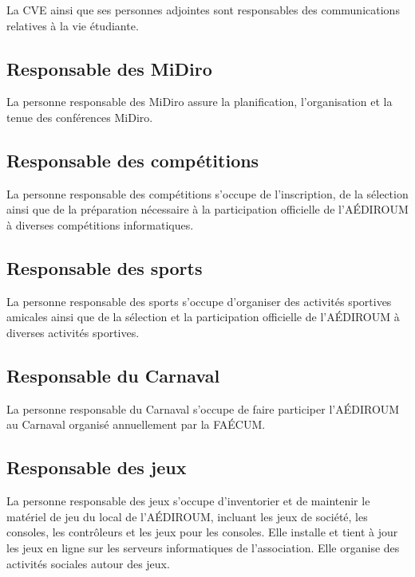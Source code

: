 \documentclass{aediroum}
\begin{document}
La CVE ainsi que ses personnes adjointes sont responsables des communications relatives à la vie étudiante.

\subsection{Responsable des MiDiro}\label{sec:responsable-midiro}

La personne responsable des MiDiro assure la planification, l'organisation et la tenue des conférences MiDiro.

\subsection{Responsable des compétitions}\label{sec:responsable-competition}

La personne responsable des compétitions s'occupe de l'inscription, de la sélection ainsi que de la préparation nécessaire à la participation officielle de l'AÉDIROUM à diverses compétitions informatiques.

\subsection{Responsable des sports}\label{sec:responsable-sport}

La personne responsable des sports s'occupe d'organiser des activités sportives amicales ainsi que de la sélection et la participation officielle de l'AÉDIROUM à diverses activités sportives.

\subsection{Responsable du Carnaval}\label{sec:responsable-carnaval}

La personne responsable du Carnaval s'occupe de faire participer l'AÉDIROUM au Carnaval organisé annuellement par la FAÉCUM.

\subsection{Responsable des jeux}\label{sec:responsable-serveur}

La personne responsable des jeux s’occupe d’inventorier et de maintenir le matériel de jeu du local de l’AÉDIROUM, incluant les jeux de société, les consoles, les contrôleurs et les jeux pour les consoles. Elle installe et tient à jour les jeux en ligne sur les serveurs informatiques de l’association. Elle organise des activités sociales autour des jeux.
\end{document}
